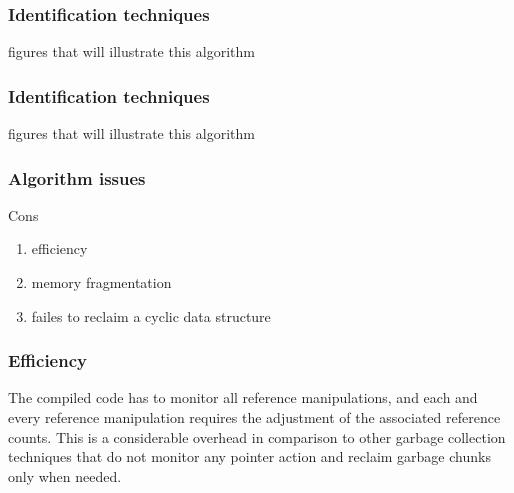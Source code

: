 \documentclass[presentation]{beamer}
\begin{document}
\begin{frame}
  \frametitle{Identification techniques} 
  \justifying
  figures that will illustrate this algorithm
\end{frame}

\begin{frame}
  \frametitle{Identification techniques} 
  \justifying
  figures that will illustrate this algorithm
\end{frame}

\begin{frame}
  \frametitle{Algorithm issues} 
  \justifying
  \begin{alertblock}{Cons}
  	\begin{enumerate}
		\item efficiency
		\item memory fragmentation
		\item failes to reclaim a cyclic data structure 	
  	\end{enumerate}
  \end{alertblock}
\end{frame}


\begin{frame}
  \frametitle{Efficiency} 
  \justifying
The compiled code has
to monitor all reference manipulations, and each and every reference manipulation
requires the adjustment of the associated reference counts. This is a considerable
overhead in comparison to other garbage collection techniques that do not monitor
any pointer action and reclaim garbage chunks only when needed.
\end{frame}
\end{document}
